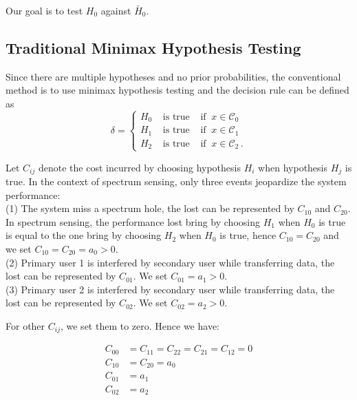 \documentclass[12pt,journal,a4paper,twoside,onecolumn]{IEEEtran}
\begin{document}
\begin{spacing}{2.5}
Our goal is to test $H_0$ against $\bar{H}_0$. 

\subsection{Traditional Minimax Hypothesis Testing}
Since there are multiple hypotheses and no prior probabilities, the conventional method is to use minimax hypothesis testing and the decision rule can be defined as
\begin{equation}
\label{equ: decR}
\delta = \begin{cases}
H_0 \;\;\;\;\text{is true}\;\;\;\;\text{if}\;\; x \in \mathcal{C}_0\\
H_1 \;\;\;\;\text{is true}\;\;\;\;\text{if}\;\; x \in \mathcal{C}_1\\
H_2 \;\;\;\;\text{is true}\;\;\;\;\text{if}\;\; x \in \mathcal{C}_2\,.
\end{cases}
\end{equation}

Let $C_{ij}$ denote the cost incurred by choosing hypothesis $H_i$ when hypothesis $H_j$ is true. 
In the context of spectrum sensing, only three events jeopardize the system performance: 
\\(1) The system miss a spectrum hole, the lost can be represented by $C_{10}$ and $C_{20}$. In spectrum sensing, the performance lost bring by choosing $H_1$ when $H_0$ is true is equal to the one bring by choosing $H_2$ when $H_0$ is true, hence $C_{10} = C_{20}$ and we set $C_{10} = C_{20} = a_0 > 0$.
\\(2) Primary user 1 is interfered by secondary user while transferring data, the lost can be represented by $C_{01}$. We set $C_{01} = a_1 > 0$.
\\(3) Primary user 2 is interfered by secondary user while transferring data, the lost can be represented by $C_{02}$. We set $C_{02} = a_2 > 0$.

For other $C_{ij}$, we set them to zero. Hence we have:

\begin{equation}
\begin{split}
C_{00} &= C_{11} = C_{22} = C_{21} = C_{12} = 0\\
C_{10} &= C_{20} = a_0\\
C_{01} &= a_1\\
C_{02} &= a_2
\end{split}
\end{equation}


\end{spacing}
\end{document}
